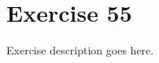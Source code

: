 \section{Exercise 55}
\begin{question}
   Exercise description goes here. 
\end{question}

\begin{solution}
\end{solution}
